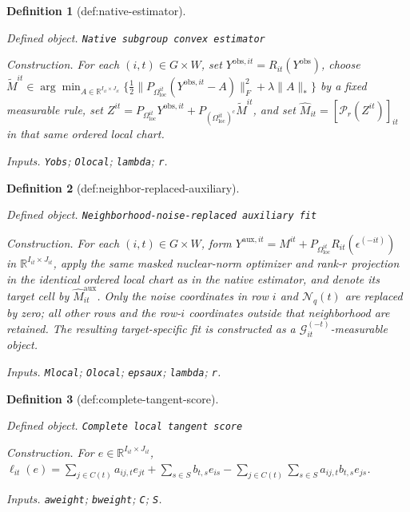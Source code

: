 \documentclass{article}
\newtheorem{definition}{Definition}
\begin{document}
\begin{definition}[def:native-estimator]\label{def:native-estimator}
\par\smallskip\noindent\emph{Defined object.} \texttt{Native subgroup convex estimator}
\par\smallskip\noindent\emph{Construction.} For each \((i,t)\in G\times W\), set \(Y^{\mathrm{obs},it}=R_{it}(Y^{\mathrm{obs}})\), choose \(\widetilde M^{it}\in\arg\min_{A\in\mathbb R^{I_{it}\times J_{it}}}\{\tfrac12\|P_{\Omega_{\mathrm{loc}}^{it}}(Y^{\mathrm{obs},it}-A)\|_F^2+\lambda\|A\|_*\}\) by a fixed measurable rule, set \(Z^{it}=P_{\Omega_{\mathrm{loc}}^{it}}Y^{\mathrm{obs},it}+P_{(\Omega_{\mathrm{loc}}^{it})^c}\widetilde M^{it}\), and set \(\widehat M_{it}=[\mathcal P_r(Z^{it})]_{it}\) in that same ordered local chart.
\par\smallskip\noindent\emph{Inputs.} \texttt{Yobs}; \texttt{Olocal}; \texttt{lambda}; \texttt{r}.
\end{definition}

\begin{definition}[def:neighbor-replaced-auxiliary]\label{def:neighbor-replaced-auxiliary}
\par\smallskip\noindent\emph{Defined object.} \texttt{Neighborhood-\allowbreak{}noise-\allowbreak{}replaced auxiliary fit}
\par\smallskip\noindent\emph{Construction.} For each \((i,t)\in G\times W\), form \(Y^{\mathrm{aux},it}=M^{it}+P_{\Omega_{\mathrm{loc}}^{it}}R_{it}(\epsilon^{(-it)})\) in \(\mathbb R^{I_{it}\times J_{it}}\), apply the same masked nuclear-norm optimizer and rank-\(r\) projection in the identical ordered local chart as in the native estimator, and denote its target cell by \(\widehat M^{\mathrm{aux}}_{it}\). Only the noise coordinates in row \(i\) and \(\mathcal N_q(t)\) are replaced by zero; all other rows and the row-\(i\) coordinates outside that neighborhood are retained. The resulting target-specific fit is constructed as a \(\mathcal G_{it}^{(-t)}\)-measurable object.
\par\smallskip\noindent\emph{Inputs.} \texttt{Mlocal}; \texttt{Olocal}; \texttt{epsaux}; \texttt{lambda}; \texttt{r}.
\end{definition}

\begin{definition}[def:complete-tangent-score]\label{def:complete-tangent-score}
\par\smallskip\noindent\emph{Defined object.} \texttt{Complete local tangent score}
\par\smallskip\noindent\emph{Construction.} For \(e\in\mathbb R^{I_{it}\times J_{it}}\), \(\ell_{it}(e)=\sum_{j\in C(t)}a_{ij,t}e_{jt}+\sum_{s\in S}b_{t,s}e_{is}-\sum_{j\in C(t)}\sum_{s\in S}a_{ij,t}b_{t,s}e_{js}\).
\par\smallskip\noindent\emph{Inputs.} \texttt{aweight}; \texttt{bweight}; \texttt{C}; \texttt{S}.
\end{definition}
\end{document}
